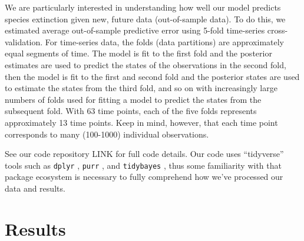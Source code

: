 \documentclass[12pt,letterpaper]{article}
\begin{document}
We are particularly interested in understanding how well our model predicts species extinction given new, future data (out-of-sample data). To do this, we estimated average out-of-sample predictive error using 5-fold time-series cross-validation. For time-series data, the folds (data partitions) are approximately equal segments of time. The model is fit to the first fold and the posterior estimates are used to predict the states of the observations in the second fold, then the model is fit to the first and second fold and the posterior states are used to estimate the states from the third fold, and so on with increasingly large numbers of folds used for fitting a model to predict the states from the subsequent fold. With 63 time points, each of the five folds represents approximately 13 time points. Keep in mind, however, that each time point corresponds to many (100-1000) individual observations.


See our code repository LINK for full code details. Our code uses ``tidyverse'' tools such as \texttt{dplyr} \citep{dplyr}, \texttt{purr} \citep{purrr}, and \texttt{tidybayes} \citep{tidybayes}, thus some familiarity with that package ecosystem is necessary to fully comprehend how we've processed our data and results.


\section{Results}
\end{document}
